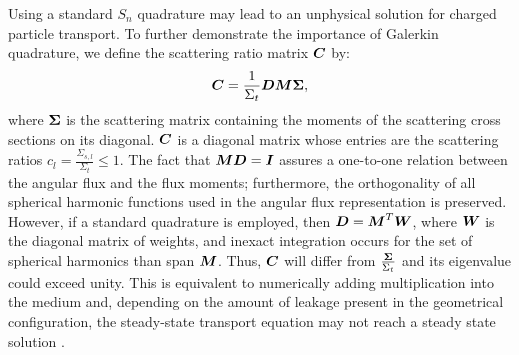 Using a standard $S_n$ quadrature may lead to an unphysical solution for
charged particle transport. To further demonstrate the importance of Galerkin
quadrature, we define the scattering ratio matrix $\boldsymbol{C}$ by:
\begin{equation}
\boldsymbol{C} = \frac{1}{\Sigma_t}\boldsymbol{D}\boldsymbol{M}\boldsymbol{\Sigma},
\end{equation}
where $\boldsymbol{\Sigma}$ is the scattering matrix containing the moments of the
scattering cross sections on its diagonal.
$\boldsymbol{C}$ is a diagonal matrix whose entries are the scattering ratios
$c_l=\frac{\Sigma_{s,l}}{\Sigma_t} \leq 1$. The fact that $\boldsymbol{MD}=\boldsymbol{I}$
assures a one-to-one relation between the angular flux and the flux moments;
furthermore, the orthogonality of all spherical harmonic functions used in the
angular flux representation is preserved. However, if a standard quadrature is
employed, then $\boldsymbol{D} = \boldsymbol{M}^T \boldsymbol{W}$, where $\boldsymbol{W}$ is the diagonal
matrix of weights, and inexact integration occurs for the set of spherical
harmonics than span $\boldsymbol{M}$. Thus, $\boldsymbol{C}$ will differ from
$\frac{\boldsymbol{\Sigma}}{\Sigma_t}$ and its eigenvalue could exceed unity. This is
equivalent to numerically adding multiplication into the medium and, depending
on the amount of leakage present in the geometrical configuration, the
steady-state transport equation may not reach a steady state solution
\cite{pautz_fp}.


